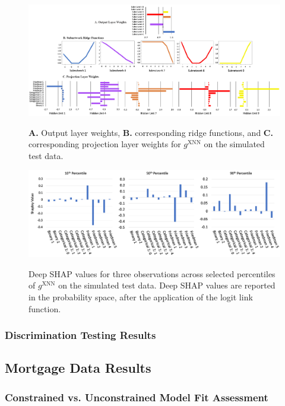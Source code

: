 \documentclass[information,article,submit,moreauthors,pdftex]{definitions/mdpi}
\begin{document}
\begin{figure}[H]
\centering
\includegraphics[width=17cm]{img/sim_xnn_glob_ridge.png}
\label{fig:sim_xnn_glob_ridge}
\caption{\textbf{A.} Output layer weights, \textbf{B.} corresponding ridge functions, and \textbf{C.} corresponding projection layer weights for $g^\text{XNN}$ on the simulated test data.}
\end{figure}   

\begin{figure}[H]
\centering
\includegraphics[width=15cm]{img/sim_xnn_loc.png}
\label{fig:sim_xnn_loc}
\caption{Deep SHAP values for three observations across selected percentiles of  $g^\text{XNN}$ on the simulated test data. Deep SHAP values are reported in the probability space, after the application of the logit link function.}
\end{figure}  

\subsubsection{Discrimination Testing Results}

\subsection{Mortgage Data Results}

\subsubsection{Constrained vs. Unconstrained Model Fit Assessment}
\end{document}
